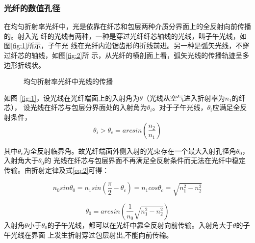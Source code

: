 \documentclass[10pt,a4paper,twoside,UTF8]{ctexart}
\begin{document}
\subsubsection{光纤的数值孔径}
在均匀折射率光纤中，光是依靠在纤芯和包层两种介质分界面上的全反射向前传播的。射入光
纤的光线有两种，一种是穿过光纤纤芯轴线的光线，叫子午光线，如图\ref{fig:1}所示，子午光
线在光纤内沿锯齿形的折线前进。另一种是弧矢光线，不穿过纤芯的轴线，如图\ref{fig:2}所
示，从光纤的横剖面上看，弧矢光线的传播轨迹呈多边形折线状。
\begin{figure}[H]
	\centering
	\caption{均匀折射率光纤中光线的传播}
	\label{fig:total1}
\end{figure}

如图 \ref{fig:1}，设光线在光纤端面上的入射角为$\theta$（光线从空气进入折射率为$n_1$的纤芯），
设光线在纤芯与包层分界面处的入射角为$\theta_i$。对于子午光线，$\theta_i$应满足全反射条件，
\begin{equation}
	\label{eq:2}
	\theta_i >\theta_c =arcsin\left(\frac{n_2}{n_1}\right)
\end{equation}

其中$\theta_c$为全反射临界角。故光纤端面外侧入射的光束存在一个最大入射孔径角$\theta_0$，入射角大于$\theta_0$的
光线在纤芯与包层界面不再满足全反射条件而无法在光纤中稳定传输。由折射定律及式\ref{eq:2}可得：

\begin{equation}
	 n_0 sin \theta_0 = n_1 sin (\frac{\pi}{2}-\theta_c)=n_1 cos\theta_c =\sqrt{n^{2}_1-n^{2}_2}
\end{equation}

\begin{equation}
	\theta_0=arcsin(\frac{1}{n_0}\sqrt{n^{2}_1-n^{2}_2})
\end{equation}
入射角$\theta$小于$\theta_0$的子午光线，都可以在光纤中靠全反射向前传输。入射角大于$\theta$的子午光线在界面
上发生折射穿过包层射出,不能向前传输。
\end{document}
